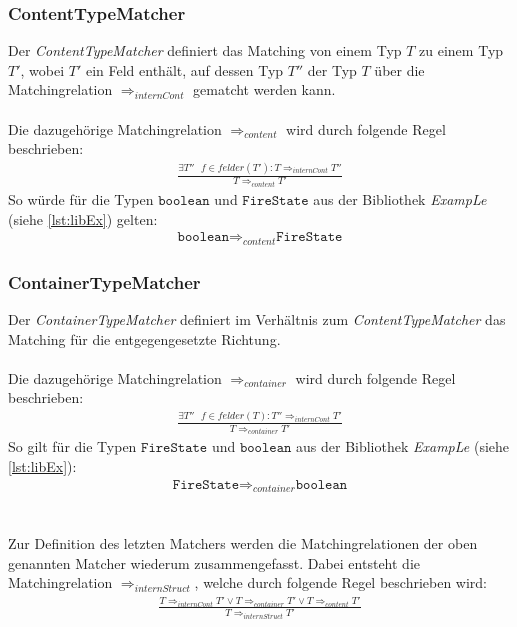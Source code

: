 \subsubsection{ContentTypeMatcher}
Der \emph{ContentTypeMatcher} definiert das Matching von einem Typ $T$ zu einem Typ $T'$, wobei $T'$ ein Feld enthält, auf dessen Typ $T''$ der Typ $T$ über die Matchingrelation $\Rightarrow_{internCont}$ gematcht werden kann.
\\\\
Die dazugehörige Matchingrelation $\Rightarrow_{content}$ wird durch folgende Regel beschrieben:
\begin{gather*}
\frac{\exists \mathit{T''\text{ }f}\in felder(T'): T \Rightarrow_{internCont} T''}{T \Rightarrow_{content} T'}
\end{gather*}
\noindent
So würde für die Typen $\texttt{boolean}$ und $\texttt{FireState}$ aus der Bibliothek \emph{ExampLe} (siehe \ref{lst:libEx}) gelten: 
\begin{gather*}
\texttt{boolean} \Rightarrow_{content} \texttt{FireState}
\end{gather*}
\subsubsection{ContainerTypeMatcher}
Der \emph{ContainerTypeMatcher} definiert im Verhältnis zum \emph{ContentTypeMatcher} das Matching für die entgegengesetzte Richtung.
\\\\
Die dazugehörige Matchingrelation $\Rightarrow_{container}$ wird durch folgende Regel beschrieben:
\begin{gather*}
\frac{\exists \mathit{T''\text{ }f}\in felder(T): T'' \Rightarrow_{internCont} T'}{T \Rightarrow_{container} T'}
\end{gather*}
\noindent
So gilt für die Typen $\texttt{FireState}$ und $\texttt{boolean}$ aus der Bibliothek \emph{ExampLe} (siehe \ref{lst:libEx}): 
\begin{gather*}
\texttt{FireState} \Rightarrow_{container} \texttt{boolean}
\end{gather*}
\\\\
Zur Definition des letzten Matchers werden die Matchingrelationen der oben genannten Matcher wiederum zusammengefasst. Dabei entsteht die Matchingrelation $\Rightarrow_{internStruct}$, welche durch folgende Regel beschrieben wird:
\begin{gather*}
\frac{T \Rightarrow_{internCont}T' \vee T \Rightarrow_{container} T' \vee T \Rightarrow_{content} T'}{T \Rightarrow_{internStruct}T'}
\end{gather*}
